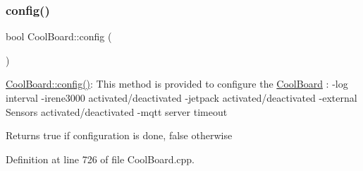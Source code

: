 \mbox{\label{class_cool_board_a583a874c09c07e70a6eb9229fc4beddb}} 
\subsubsection{\texorpdfstring{config()}{config()}}
{\footnotesize\ttfamily bool Cool\+Board\+::config (\begin{DoxyParamCaption}{ }\end{DoxyParamCaption})}

\hyperlink{class_cool_board_a583a874c09c07e70a6eb9229fc4beddb}{Cool\+Board\+::config()}\+: This method is provided to configure the \hyperlink{class_cool_board}{Cool\+Board} \+: -\/log interval -\/irene3000 activated/deactivated -\/jetpack activated/deactivated -\/external Sensors activated/deactivated -\/mqtt server timeout

\begin{DoxyReturn}{Returns}
true if configuration is done, false otherwise 
\end{DoxyReturn}


Definition at line 726 of file Cool\+Board.\+cpp.


